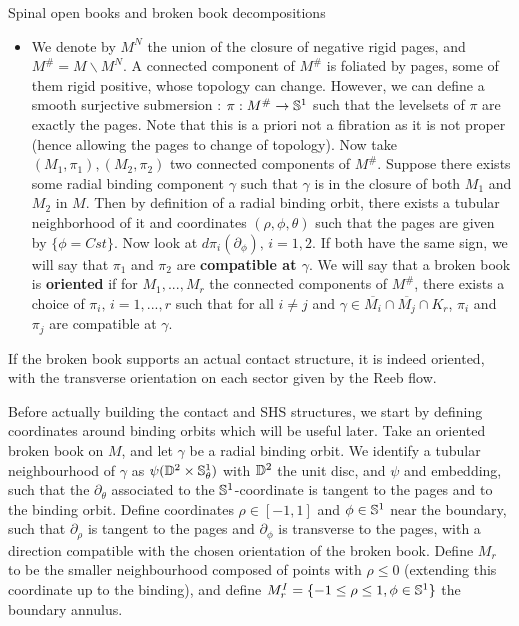 \documentclass[../main.tex]{subfiles}
\begin{document}
\begin{section}{Spinal open books and broken book decompositions}
\begin{definition}
\begin{itemize}
    \item We denote by $M^N$ the union of the closure of negative rigid pages, and  $M^\#  = M\backslash M^N$. A connected component of $M^\#$ is foliated by pages, some of them rigid positive, whose topology can change. However, we can define a smooth surjective submersion : $\pi : M^\# \rightarrow \mathbb{S}^1$ such that the levelsets of $\pi$ are exactly the pages. Note that this is a priori not a fibration as it is not proper (hence allowing the pages to change of topology). Now take $(M_1,\pi_1),(M_2,\pi_2)$ two connected components of $M^\#$. Suppose there exists some radial binding component $\gamma$ such that $\gamma$ is in the closure of both $M_1$ and $M_2$ in $M$. Then by definition of a radial binding orbit, there exists a tubular neighborhood of it and coordinates $(\rho,\phi,\theta)$ such that the pages are given by $\{\phi =Cst\}$. Now look at $d\pi_i(\partial_\phi),\,i  = 1,2$. If both have the same sign, we will say that $\pi_1$ and $\pi_2$ are \textbf{compatible at $\gamma$}. We will say that a broken book is \textbf{oriented} if for $M_1,...,M_r$ the connected components of $M^\#$, there exists a choice of $\pi_i, \, i = 1,...,r$ such that for all $i\neq j$ and $\gamma \in \overline{M_i}\cap\overline{M_j}\cap K_r$, $\pi_i$ and $\pi_j$ are compatible at $\gamma$.
    
\end{itemize}
\end{definition}


\begin{remark}
    If the broken book supports an actual contact structure, it is indeed oriented, with the transverse orientation on each sector given by the Reeb flow. 
\end{remark}

Before actually building the contact and SHS structures, we start by defining coordinates around binding orbits which will be useful later. Take an oriented broken book on $M$, and let $\gamma$ be a radial binding orbit. We identify a tubular neighbourhood of $\gamma$ as $\psi(\mathbb{D}^2\times \mathbb{S}^1_\theta)$ with $\mathbb{D}^2$ the unit disc, and $\psi$ and embedding, such that the $\partial_\theta$ associated to the $\mathbb{S}^1$-coordinate is tangent to the pages and to the binding orbit. Define coordinates $\rho \in[-1,1]$ and $\phi \in \mathbb{S}^1$ near the boundary, such that $\partial_\rho$ is tangent to the pages and $\partial_\phi$ is transverse to the pages, with a direction compatible with the chosen orientation of the broken book. Define $M_r$ to be the smaller neighbourhood composed of points with $\rho\leq 0$ (extending this coordinate up to the binding), and define $M^I_r = \{-1\leq \rho\leq 1,\phi\in \mathbb{S}^1\}$ the boundary annulus.


\end{section}
\end{document}
